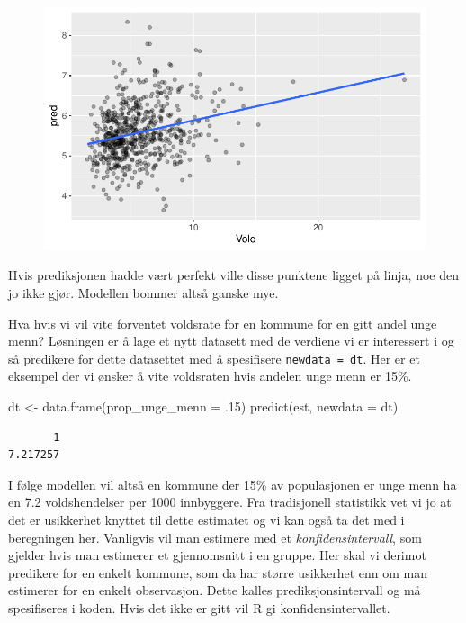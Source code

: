 \documentclass[
  letterpaper,
  DIV=11,
  numbers=noendperiod]{scrreprt}
\newenvironment{Shaded}{\begin{snugshade}}{\end{snugshade}}
\newcommand{\AttributeTok}[1]{\textcolor[rgb]{0.40,0.45,0.13}{#1}}
\newcommand{\DecValTok}[1]{\textcolor[rgb]{0.68,0.00,0.00}{#1}}
\newcommand{\FunctionTok}[1]{\textcolor[rgb]{0.28,0.35,0.67}{#1}}
\newcommand{\NormalTok}[1]{\textcolor[rgb]{0.00,0.23,0.31}{#1}}
\newcommand{\OtherTok}[1]{\textcolor[rgb]{0.00,0.23,0.31}{#1}}
\theoremstyle{definition}
\theoremstyle{remark}
\begin{document}
\begin{figure}[H]

{\centering \includegraphics{./linear_regresjon_files/figure-pdf/unnamed-chunk-7-1.pdf}

}

\end{figure}

Hvis prediksjonen hadde vært perfekt ville disse punktene ligget på
linja, noe den jo ikke gjør. Modellen bommer altså ganske mye.

Hva hvis vi vil vite forventet voldsrate for en kommune for en gitt
andel unge menn? Løsningen er å lage et nytt datasett med de verdiene vi
er interessert i og så predikere for dette datasettet med å spesifisere
\texttt{newdata\ =\ dt}. Her er et eksempel der vi ønsker å vite
voldsraten hvis andelen unge menn er 15\%.

\begin{Shaded}
\begin{Highlighting}[]
\NormalTok{dt }\OtherTok{\textless{}{-}} \FunctionTok{data.frame}\NormalTok{(}\AttributeTok{prop\_unge\_menn =}\NormalTok{ .}\DecValTok{15}\NormalTok{)}
\FunctionTok{predict}\NormalTok{(est, }\AttributeTok{newdata =}\NormalTok{ dt)}
\end{Highlighting}
\end{Shaded}

\begin{verbatim}
       1 
7.217257 
\end{verbatim}

I følge modellen vil altså en kommune der 15\% av populasjonen er unge
menn ha en 7.2 voldshendelser per 1000 innbyggere. Fra tradisjonell
statistikk vet vi jo at det er usikkerhet knyttet til dette estimatet og
vi kan også ta det med i beregningen her. Vanligvis vil man estimere med
et \emph{konfidensintervall}, som gjelder hvis man estimerer et
gjennomsnitt i en gruppe. Her skal vi derimot predikere for en enkelt
kommune, som da har større usikkerhet enn om man estimerer for en enkelt
observasjon. Dette kalles prediksjonsintervall og må spesifiseres i
koden. Hvis det ikke er gitt vil R gi konfidensintervallet.
\end{document}
